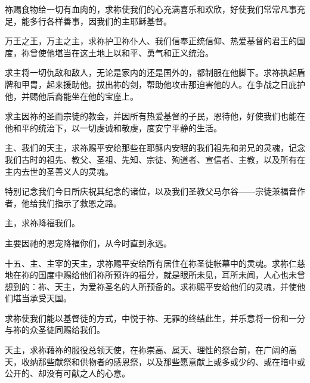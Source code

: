 祢赐食物给一切有血肉的，求祢使我们的心充满喜乐和欢欣，好使我们常常凡事充足，能多行各样善事，因我们的主耶稣基督。\par

万王之王，万主之主，求祢护卫祢仆人、我们信奉正统信仰、热爱基督的君王的国度，祢曾使他堪当在这土地上以和平、勇气和正义统治。\par

求主将一切仇敌和敌人，无论是家内的还是国外的，都制服在他脚下。求祢执起盾牌和甲胄，起来援助他。拔出祢的剑，帮助他攻击那迫害他的人。在争战之日庇护他，并赐他后裔能坐在他的宝座上。\par

求主因祢的圣而宗徒的教会，并因所有热爱基督的子民，恩待他，好使我们也能在他和平的统治下，以一切虔诚和敬虔，度安宁平静的生活。\par

主、我们的天主，求祢赐平安给那些在耶稣内安眠的我们祖先和弟兄的灵魂，记念我们古时的祖先、教父、圣祖、先知、宗徒、殉道者、宣信者、主教，以及所有在主内去世的圣善义人的灵魂。\par

特别记念我们今日所庆祝其纪念的诸位，以及我们圣教父马尔谷——宗徒兼福音作者，他给我们指示了救恩之路。\par

\par

主，求祢降福我们。\par

\par

主要因祂的恩宠降福你们，从今时直到永远。\par

\par

\par

十五、主、主宰的天主，求祢赐平安给所有居住在祢圣徒帐幕中的灵魂。求祢仁慈地在祢的国度中赐给他们祢所预许的福分，就是眼所未见，耳所未闻，人心也未曾想到的：祢、天主，为爱祢圣名的人所预备的。求祢赐平安给他们的灵魂，并使他们堪当承受天国。\par

求祢使我们能以基督徒的方式，中悦于祢、无罪的终结此生，并乐意将一份和一分与祢的众圣徒同赐给我们。\par

天主，求祢藉祢的服役总领天使，在祢崇高、属天、理性的祭台前，在广阔的高天，收纳那些献祭和供物者的感恩祭，以及那些愿意献上或多或少的、或在暗中或公开的、却没有可献之人的心意。\par


